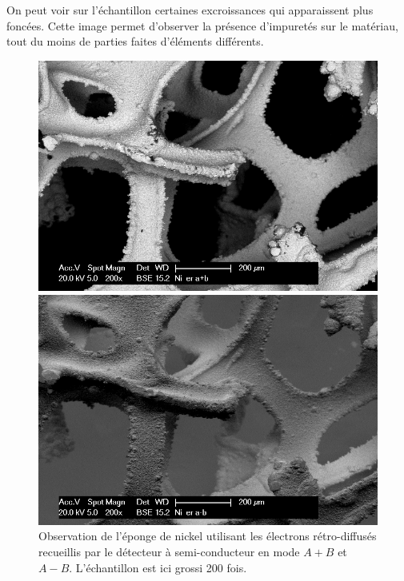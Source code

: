 \documentclass[a4paper,12pt]{article}
\begin{document}
On peut voir sur l'échantillon certaines excroissances qui apparaissent plus foncées. Cette image permet d'observer
la présence d'impuretés sur le matériau, tout du moins de parties faites d'éléments différents.


\begin{figure}
\begin{minipage}[c]{.5\linewidth}
\centering
\includegraphics[width = 1 \textwidth]{images/ni_er_apb.png}
\end{minipage}
\begin{minipage}[c]{.5\linewidth}
\includegraphics[width = 1 \textwidth]{images/ni_er_amb.png}
\end{minipage}
\caption{Observation de l'éponge de nickel utilisant les électrons rétro-diffusés recueillis par le détecteur à semi-conducteur en mode $A+B$ et $A-B$. L'échantillon est ici grossi 200 fois.}
\label{fig:ni_er_apb_amb}
\end{figure}
\end{document}
